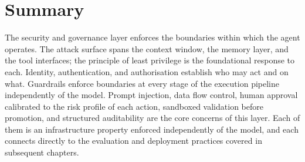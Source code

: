 \section{Summary}

The security and governance layer enforces the boundaries within which the agent
operates. The attack surface spans the context window, the memory layer, and the tool
interfaces; the principle of least privilege is the foundational response to each.
Identity, authentication, and authorisation establish who may act and on what. Guardrails
enforce boundaries at every stage of the execution pipeline independently of the model.
Prompt injection, data flow control, human approval calibrated to the risk profile of
each action, sandboxed validation before promotion, and structured auditability are the
core concerns of this layer. Each of them is an infrastructure property enforced
independently of the model, and each connects directly to the evaluation and deployment
practices covered in subsequent chapters.
